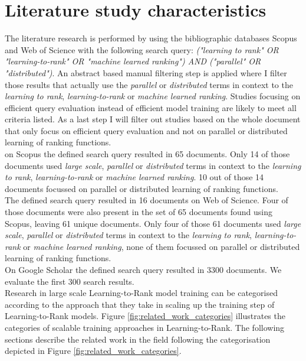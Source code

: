 \section{Literature study characteristics}
The literature research is performed by using the bibliographic databases Scopus and Web of Science with the following search query: \emph{("learning to rank" OR "learning-to-rank" OR "machine learned ranking") AND ("parallel" OR "distributed")}. An abstract based manual filtering step is applied where I filter those results that actually use the \emph{parallel} or \emph{distributed} terms in context to the \emph{learning to rank}, \emph{learning-to-rank} or \emph{machine learned ranking}. Studies focusing on efficient query evaluation instead of efficient model training are likely to meet all criteria listed. As a last step I will filter out studies based on the whole document that only focus on efficient query evaluation and not on parallel or distributed learning of ranking functions.\\

on Scopus the defined search query resulted in 65 documents. Only 14 of those documents used \emph{large scale}, \emph{parallel} or \emph{distributed} terms in context to the \emph{learning to rank}, \emph{learning-to-rank} or \emph{machine learned ranking}. 10 out of those 14 documents focussed on parallel or distributed learning of ranking functions.\\

The defined search query resulted in 16 documents on Web of Science. Four of those documents were also present in the set of 65 documents found using Scopus, leaving 61 unique documents. Only four of those 61 documents used \emph{large scale}, \emph{parallel} or \emph{distributed} terms in context to the \emph{learning to rank}, \emph{learning-to-rank} or \emph{machine learned ranking}, none of them focussed on parallel or distributed learning of ranking functions.\\

On Google Scholar the defined search query resulted in 3300 documents. We evaluate the first 300 search results.\\

Research in large scale Learning-to-Rank model training can be categorised according to the approach that they take in scaling up the training step of Learning-to-Rank models. Figure \ref{fig:related_work_categories} illustrates the categories of scalable training approaches in Learning-to-Rank. The following sections describe the related work in the field following the categorisation depicted in Figure \ref{fig:related_work_categories}.

